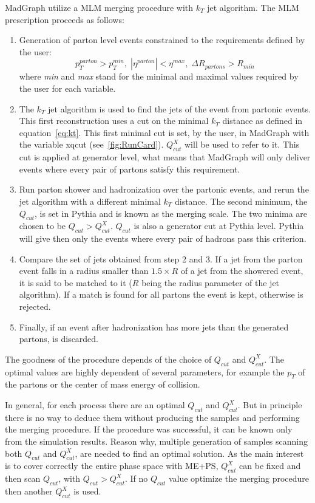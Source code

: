 MadGraph utilize a MLM merging procedure with $k_{T}$ jet algorithm. The MLM prescription proceeds as follows:
\begin{enumerate}
\item Generation of parton level events constrained to the requirements defined by the user:
  \begin{equation*}
    p_{T}^{parton}>p_{T}^{min}, \; |\eta^{parton}|<\eta^{max}, \; \Delta R_{partons}>R_{min}
  \end{equation*} where \textit{min} and \textit{max} stand for the minimal and maximal values required by the user for each variable.
\item The $k_{T}$ jet algorithm is used to find the jets of the event from partonic events. This first reconstruction uses a cut on the minimal $k_{T}$ distance as defined in equation~\ref{eq:kt}. This first minimal cut is set, by the user, in MadGraph with the variable xqcut (see~\ref{fig:RunCard}). $Q^{X}_{cut}$ will be used to refer to it. This cut is applied at generator level, what means that MadGraph will only deliver events where every pair of partons satisfy this requirement.
\item Run parton shower and hadronization over the partonic events, and rerun the jet algorithm with a different minimal $k_{T}$ distance. The second minimum, the $Q_{cut}$, is set in Pythia and is known as the merging scale. The two minima are chosen to be $Q_{cut}>Q^{X}_{cut}$. $Q_{cut}$ is also a generator cut at Pythia level. Pythia will give then only the events where every pair of hadrons pass this criterion.
\item Compare the set of jets obtained from step 2 and 3. If a jet from the parton event falls in a radius smaller than $1.5 \times R$ of a jet from the showered event, it is said to be matched to it ($R$ being the radius parameter of the jet algorithm). If a match is found for all partons the event is kept, otherwise is rejected.
\item Finally, if an event after hadronization has more jets than the generated partons, is discarded. %
\end{enumerate}

The goodness of the procedure depends of the choice of $Q_{cut}$ and $Q^{X}_{cut}$. The optimal values are highly dependent of several parameters, for example the $p_{T}$ of the partons or the center of mass energy of collision. 

In general, for each process there are an optimal $Q_{cut}$ and $Q^{X}_{cut}$. But in principle there is no way to deduce them without producing the samples and performing the merging procedure. If the procedure was successful, it can be known only from the simulation results. Reason why, multiple generation of samples scanning both $Q_{cut}$ and $Q^{X}_{cut}$, are needed to find an optimal solution. As the main interest is to cover correctly the entire phase space with ME+PS, $Q^{X}_{cut}$ can be fixed and then scan $Q_{cut}$, with $Q_{cut}>Q^{X}_{cut}$. If no $Q_{cut}$ value optimize the merging procedure then another $Q^{X}_{cut}$ is used. 

